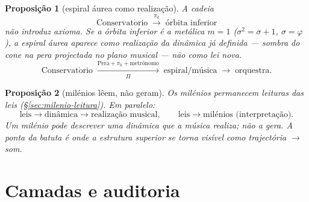 \documentclass[11pt,a4paper]{article}
\newtheorem{proposicao}{Proposição}
\begin{document}
\begin{proposicao}[espiral áurea como realização]\label{prop:espiral-real}
A cadeia
\[
\mathrm{Conservat\acute{o}rio}
\;\xrightarrow{\pi_k}\;
\text{órbita inferior}
\]
não introduz axioma. Se a órbita inferior é a metálica $m=1$
($\sigma^{2}=\sigma+1$, $\sigma=\varphi$), a espiral áurea aparece
como realização da dinâmica já definida --- sombra do cone na
pera projectada no plano musical --- não como lei nova.
\[
\boxed{
\mathrm{Conservat\acute{o}rio}
\;\xrightarrow[\Pi]{\mathrm{Pera}+\pi_k+\text{metrónomo}}\;
\text{espiral/música}
\;\longrightarrow\;
\text{orquestra}.
}
\]
\end{proposicao}

\begin{proposicao}[milénios lêem, não geram]\label{prop:milenio-dinamica}
Os milénios permanecem leituras das leis
(\S\ref{sec:milenio-leitura}). Em paralelo:
\[
\text{leis}\to\text{dinâmica}\to\text{realização musical},
\qquad
\text{leis}\to\text{milénios (interpretação)}.
\]
Um milénio pode \emph{descrever} uma dinâmica que a música realiza;
não a gera. A ponta da batuta é onde a estrutura superior se torna
visível como trajectória $\to$ som.
\end{proposicao}


\section{Camadas e auditoria}\label{sec:auditoria}
\end{document}
